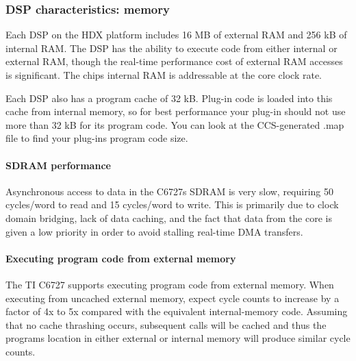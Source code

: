 \hypertarget{a00832_subsection__dsp_characteristics_memory}{}\subsubsection{D\+S\+P characteristics\+: memory}\label{a00832_subsection__dsp_characteristics_memory}
 Each D\+SP on the H\+DX platform includes 16 MB of external R\+AM and 256 kB of internal R\+AM. The D\+SP has the ability to execute code from either internal or external R\+AM, though the real-\/time performance cost of external R\+AM accesses is significant. The chip\textquotesingle{}s internal R\+AM is addressable at the core clock rate.

Each D\+SP also has a program cache of 32 kB. Plug-\/in code is loaded into this cache from internal memory, so for best performance your plug-\/in should not use more than 32 kB for its program code. You can look at the C\+C\+S-\/generated .map file to find your plug-\/in\textquotesingle{}s program code size.

\hypertarget{a00832_subsubsection__sdram_performance_}{}\paragraph{S\+D\+R\+A\+M performance}\label{a00832_subsubsection__sdram_performance_}
 Asynchronous access to data in the C6727\textquotesingle{}s S\+D\+R\+AM is very slow, requiring 50 cycles/word to read and 15 cycles/word to write. This is primarily due to clock domain bridging, lack of data caching, and the fact that data from the core is given a low priority in order to avoid stalling real-\/time D\+MA transfers. \hypertarget{a00832_subsubsection__executing_program_code_from_external_memory_}{}\paragraph{Executing program code from external memory}\label{a00832_subsubsection__executing_program_code_from_external_memory_}
 The TI C6727 supports executing program code from external memory. When executing from uncached external memory, expect cycle counts to increase by a factor of 4x to 5x compared with the equivalent internal-\/memory code. Assuming that no cache thrashing occurs, subsequent calls will be cached and thus the program\textquotesingle{}s location in either external or internal memory will produce similar cycle counts.

